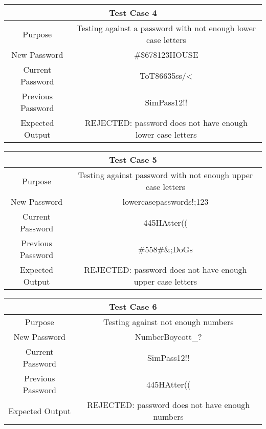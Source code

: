 \documentclass[12pt,letterpaper]{article}
\begin{document}
\begin{center}
  \begin{tabular}{||c|c||}
  \hline
  \multicolumn{2}{||c||}{Test Case 4} \\
  \hline
  Purpose & Testing against a password with not enough lower case letters \\
  \hline
  New Password & \#\$678123HOUSE \\
  \hline
  Current Password & ToT86635ss/\textless \\
  \hline
  Previous Password & SimPass12!! \\
  \hline
  Expected Output & REJECTED: password does not have enough lower case letters \\
  \hline
  \end{tabular}
\end{center}
\vspace{1mm}
\begin{center}
  \begin{tabular}{||c|c||}
  \hline
  \multicolumn{2}{||c||}{Test Case 5} \\
  \hline
  Purpose & Testing against password with not enough upper case letters \\
  \hline
  New Password & lowercasepasswords!;123 \\
  \hline
  Current Password & 445HAtter(( \\
  \hline
  Previous Password & \#558\#\&;DoGs \\
  \hline
  Expected Output & REJECTED: password does not have enough upper case letters \\
  \hline
  \end{tabular}
\end{center}
\vspace{1mm}
\begin{center}
  \begin{tabular}{||c|c||}
  \hline
  \multicolumn{2}{||c||}{Test Case 6} \\
  \hline
  Purpose & Testing against not enough numbers \\
  \hline
  New Password & NumberBoycott\_? \\
  \hline
  Current Password & SimPass12!! \\
  \hline
  Previous Password & 445HAtter(( \\
  \hline
  Expected Output & REJECTED: password does not have enough numbers \\
  \hline
  \end{tabular}
\end{center}
\end{document}
